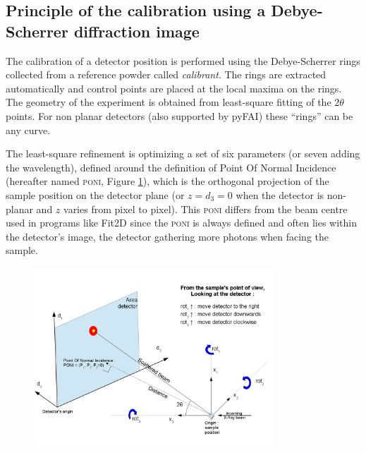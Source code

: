 \documentclass[preprint]{iucr}              %
\let\caption\foo
\begin{document}
\subsection{Principle of the calibration using a Debye-Scherrer diffraction
image}
The calibration of a detector position is performed using the Debye-Scherrer
rings collected from a reference powder called \textit{calibrant}.
The rings are extracted automatically and control points are placed at the
local maxima on the rings.
The geometry of the experiment is obtained from least-square fitting of
the $2\theta$ points.
For non planar detectors (also supported by pyFAI) these ``rings'' can
be any curve.

The least-square refinement is optimizing a set of six parameters
(or seven adding the wavelength), defined around the  definition of Point
Of Normal Incidence (hereafter named \textsc{poni}, Figure \ref{poni}), which is
the orthogonal projection  of the sample position on the detector plane (or
$z=d_3=0$ when the detector is non-planar and $z$ varies from pixel to pixel).
This \textsc{poni} differs from the beam centre used in programs like
Fit2D \cite{Hammersley:fs5107} since the \textsc{poni} is always defined and often lies
within the detector's image, the detector gathering more photons 
when facing the sample.

\begin{figure}
\label{poni}
\begin{center}
\includegraphics[width=9cm]{images/PONI.png}
\caption{Geometry used in pyFAI.}
\end{center}
\end{figure}
\end{document}
